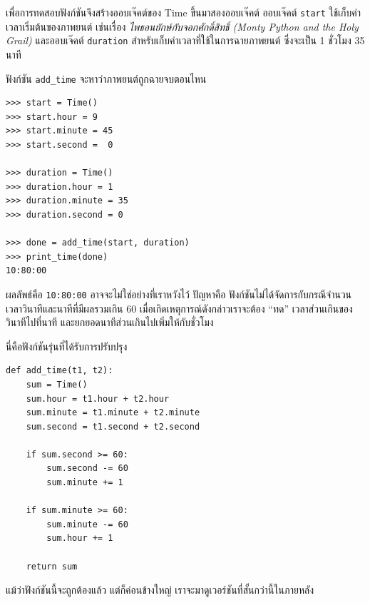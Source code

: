 เพื่อการทดสอบฟังก์ชันจึงสร้างออบเจ๊คต์ของ Time ขึ้นมาสองออบเจ๊คต์ ออบเจ๊คต์ {\tt start} ใช้เก็บค่าเวลาเริ่มต้นของภาพยนต์ 
เช่นเรื่อง {\em ไพธอนยักษ์กับจอกศักดิ์สิทธิ์ (Monty Python and the Holy Grail)} และออบเจ๊คต์ {\tt duration} 
สำหรับเก็บค่าเวลาที่ใช้ในการฉายภาพยนต์ ซึ่งจะเป็น 1 ชั่วโมง 35 นาที

ฟังก์ชัน \verb"add_time" จะหาว่าภาพยนต์ถูกฉายจบตอนไหน

\begin{verbatim}
>>> start = Time()
>>> start.hour = 9
>>> start.minute = 45
>>> start.second =  0

>>> duration = Time()
>>> duration.hour = 1
>>> duration.minute = 35
>>> duration.second = 0

>>> done = add_time(start, duration)
>>> print_time(done)
10:80:00
\end{verbatim}
%

ผลลัพธ์คือ {\tt 10:80:00} อาจจะไม่ใช่อย่างที่เราหวังไว้ ปัญหาคือ ฟังก์ชันไม่ได้จัดการกับกรณีจำนวนเวลาวินาทีและนาทีที่มีผลรวมเกิน 60 
เมื่อเกิดเหตุการณ์ดังกล่าวเราจะต้อง ``ทด'' เวลาส่วนเกินของวินาทีไปที่นาที และยกยอดนาทีส่วนเกินไปเพิ่มให้กับชั่วโมง

นี่คือฟังก์ชันรุ่นที่ได้รับการปรับปรุง

\begin{verbatim}
def add_time(t1, t2):
    sum = Time()
    sum.hour = t1.hour + t2.hour
    sum.minute = t1.minute + t2.minute
    sum.second = t1.second + t2.second

    if sum.second >= 60:
        sum.second -= 60
        sum.minute += 1

    if sum.minute >= 60:
        sum.minute -= 60
        sum.hour += 1

    return sum
\end{verbatim}
%
แม้ว่าฟังก์ชันนี้จะถูกต้องแล้ว แต่ก็ค่อนข้างใหญ่ เราจะมาดูเวอร์ชันที่สั้นกว่านี้ในภายหลัง

